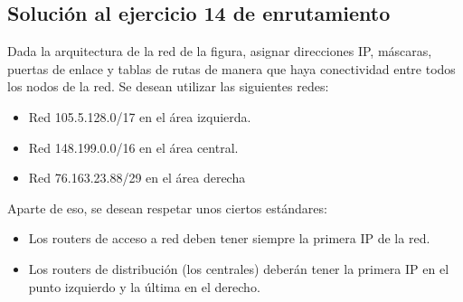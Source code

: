 \documentclass[letterpaper,10pt,spanish]{sphinxmanual}
\begin{document}
\subsection{Solución al ejercicio 14 de enrutamiento}
\label{\detokenize{t2_integracion_elementos/ejercicios_subredes_ipv4/ejercicios_dos_router:solucion-al-ejercicio-14-de-enrutamiento}}
\sphinxAtStartPar
Dada la arquitectura de la red de la figura, asignar direcciones IP, máscaras, puertas de enlace y tablas de rutas de manera que haya conectividad entre todos
los nodos de la red. Se desean utilizar las siguientes redes:
\begin{itemize}
\item {} 
\sphinxAtStartPar
Red 105.5.128.0/17 en el área izquierda.

\item {} 
\sphinxAtStartPar
Red 148.199.0.0/16 en el área central.

\item {} 
\sphinxAtStartPar
Red 76.163.23.88/29 en el área derecha

\end{itemize}

\begin{figure}[htbp]
\centering

\noindent{}
\end{figure}

\sphinxAtStartPar
Aparte de eso, se desean respetar unos ciertos estándares:
\begin{itemize}
\item {} 
\sphinxAtStartPar
Los routers de acceso a red deben tener siempre la primera IP de la red.

\item {} 
\sphinxAtStartPar
Los routers de distribución (los centrales) deberán tener la primera IP en el punto izquierdo y la última en el derecho.

\end{itemize}
\end{document}
